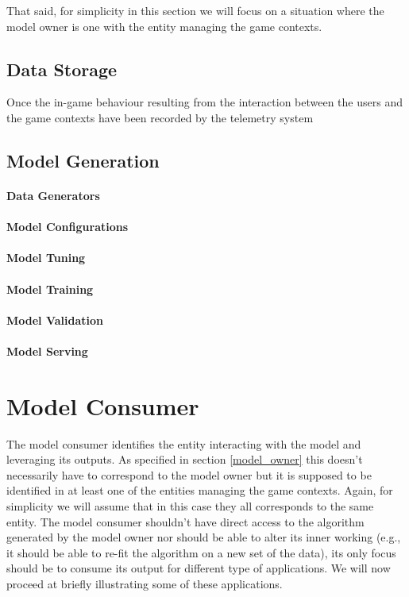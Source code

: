 That said, for simplicity in this section we will focus on a situation where the model owner is one with the entity managing the game contexts.

\subsection{Data Storage}
Once the in-game behaviour resulting from the interaction between the users and the game contexts have been recorded by the telemetry system

\subsection{Model Generation}
\lorem
\paragraph*{Data Generators} \lorem
\paragraph*{Model Configurations} \lorem
\paragraph*{Model Tuning} \lorem
\paragraph*{Model Training} \lorem
\paragraph*{Model Validation} \lorem
\paragraph*{Model Serving} \lorem

\section{Model Consumer}
The model consumer identifies the entity interacting with the model and leveraging its outputs. As specified in section \ref{model_owner} this doesn't necessarily have to correspond to the model owner but it is supposed to be identified in at least one of the entities managing the game contexts. Again, for simplicity we will assume that in this case they all corresponds to the same entity. The model consumer shouldn't have direct access to the algorithm generated by the model owner nor should be able to alter its inner working (e.g., it should be able to re-fit the algorithm on a new set of the data), its only focus should be to consume its output for different type of applications. We will now proceed at briefly illustrating some of these applications.

